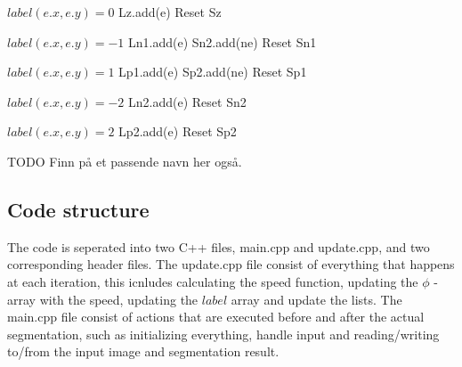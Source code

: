 \begin{algorithm}[h!]
\begin{algorithmic}[1]
		\State $label(e.x, e.y) = 0$
		\State Lz.add(e)
	\EndFor
	\State Reset Sz
	
		\State $label(e.x, e.y) = -1$
		\State Ln1.add(e)
		 
				\State Sn2.add(ne)
			\EndIf
		\EndFor
	\EndFor
	\State Reset Sn1
	
		\State $label(e.x, e.y) = 1$
		\State Lp1.add(e)
				\State Sp2.add(ne)
			\EndIf
		\EndFor
	\EndFor
	\State Reset Sp1
	
		\State $label(e.x, e.y) = -2$
		\State Ln2.add(e)
	\EndFor
	\State Reset Sn2
	
		\State $label(e.x, e.y) = 2$
		\State Lp2.add(e)
	\EndFor
	\State Reset Sp2
\end{algorithmic}
\caption{TODO Finn på et passende navn her også.}
\label{updateLevelSets}
\end{algorithm}
\clearpage

\subsection{Code structure}
The code is seperated into two C++ files, main.cpp and update.cpp, and two corresponding header files. The update.cpp file consist of everything that happens at each iteration, this icnludes calculating the speed function, updating the $\phi$ - array with the speed, updating the $label$ array and update the lists. The main.cpp file consist of actions that are executed before and after the actual segmentation, such as initializing everything, handle input and reading/writing to/from the input image and segmentation result. 

